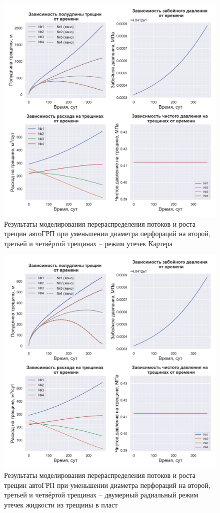 \begin{figure}[H] 
\center
\includegraphics[width=\linewidth]{images/myimage9.jpg}
\caption{Результаты моделирования перераспределения потоков и роста трещин автоГРП при уменьшении диаметра перфораций на второй, третьей и четвёртой трещинах -- режим утечек Картера}
\label{fig:myimage9}
\end{figure}


\begin{figure}[H] 
\center
\includegraphics[width=\linewidth]{images/myimage10.jpg}
\caption{Результаты моделирования перераспределения потоков и роста трещин автоГРП при уменьшении диаметра перфораций на второй, третьей и четвёртой трещинах -- двумерный радиальный режим утечек жидкости из трещины в пласт}
\label{fig:myimage10}
\end{figure}

